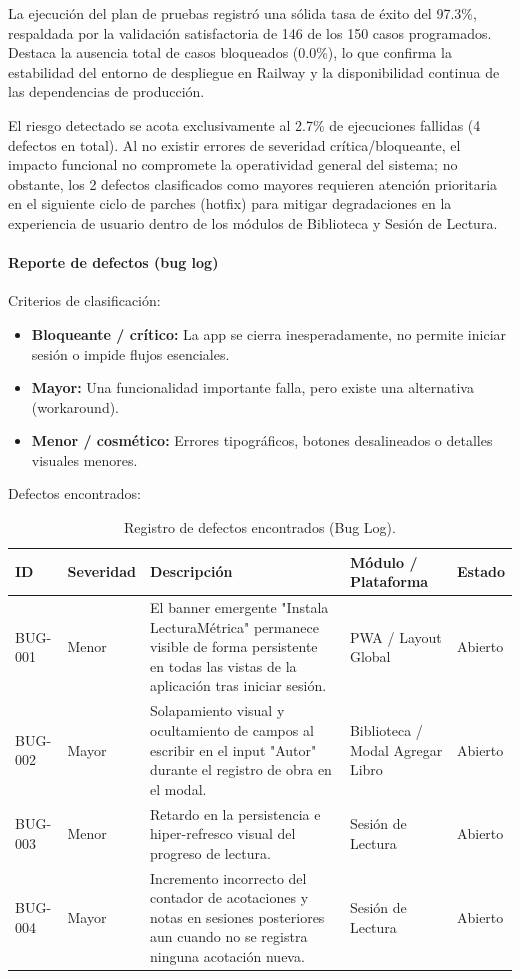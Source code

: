 \documentclass[12pt, atypical, journal]{article}
\begin{document}
La ejecución del plan de pruebas registró una sólida tasa de éxito del 97.3\%, respaldada por la validación satisfactoria de 146 de los 150 casos programados. Destaca la ausencia total de casos bloqueados (0.0\%), lo que confirma la estabilidad del entorno de despliegue en Railway y la disponibilidad continua de las dependencias de producción. 

El riesgo detectado se acota exclusivamente al 2.7\% de ejecuciones fallidas (4 defectos en total). Al no existir errores de severidad crítica/bloqueante, el impacto funcional no compromete la operatividad general del sistema; no obstante, los 2 defectos clasificados como mayores requieren atención prioritaria en el siguiente ciclo de parches (hotfix) para mitigar degradaciones en la experiencia de usuario dentro de los módulos de Biblioteca y Sesión de Lectura.

\paragraph{Reporte de defectos (bug log)}
Criterios de clasificación:
\begin{itemize}
    \item \textbf{Bloqueante / crítico:} La app se cierra inesperadamente, no permite iniciar sesión o impide flujos esenciales.
    \item \textbf{Mayor:} Una funcionalidad importante falla, pero existe una alternativa (workaround).
    \item \textbf{Menor / cosmético:} Errores tipográficos, botones desalineados o detalles visuales menores.
\end{itemize}

Defectos encontrados:
\begin{table}[H]
\centering
\small
\renewcommand{\arraystretch}{1.2}
\begin{tabular}{|l|l|p{4.8cm}|p{3.2cm}|l|}
\hline
\textbf{ID} & \textbf{Severidad} & \textbf{Descripción} & \textbf{Módulo / Plataforma} & \textbf{Estado} \\ \hline
BUG-001 & Menor & El banner emergente "Instala LecturaMétrica" permanece visible de forma persistente en todas las vistas de la aplicación tras iniciar sesión. & PWA / Layout Global & Abierto \\ \hline
BUG-002 & Mayor & Solapamiento visual y ocultamiento de campos al escribir en el input "Autor" durante el registro de obra en el modal. & Biblioteca / Modal Agregar Libro & Abierto \\ \hline
BUG-003 & Menor & Retardo en la persistencia e hiper-refresco visual del progreso de lectura. & Sesión de Lectura & Abierto \\ \hline
BUG-004 & Mayor & Incremento incorrecto del contador de acotaciones y notas en sesiones posteriores aun cuando no se registra ninguna acotación nueva. & Sesión de Lectura & Abierto \\ \hline
\end{tabular}
\caption{Registro de defectos encontrados (Bug Log).}
\label{tab:bug_log}
\end{table}
\end{document}
